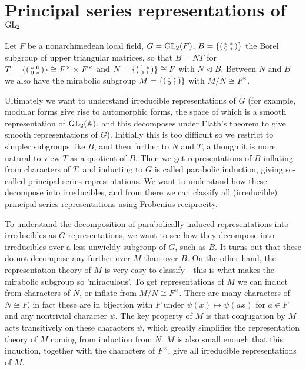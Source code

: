 \section{Principal series representations of $\mathrm{GL}_2$}

Let $F$ be a nonarchimedean local field, $G=\mathrm{GL}_2(F)$, $B=\{\begin{psmallmatrix} *&*\\0&*\end{psmallmatrix}\}$ the Borel subgroup of upper triangular matrices, so that $B=NT$ for $T=\{\begin{psmallmatrix}
    *&0\\0&*
\end{psmallmatrix}\} \cong F^\times \times F^\times$ and $N=\{\begin{psmallmatrix}
    1&*\\0&1
\end{psmallmatrix}\}\cong F$ with $N \lhd B$. Between $N$ and $B$ we also have the mirabolic subgroup $M=\{\begin{psmallmatrix}
    *&*\\0&1
\end{psmallmatrix}\}$ with $M/N \cong F^\times$.

Ultimately we want to understand irreducible representations of $G$ (for example, modular forms give rise to automorphic forms, the space of which is a smooth representation of $\mathrm{GL}_2(\mathbb{A})$, and this decomposes under Flath's theorem to give smooth representations of $G$). Initially this is too difficult so we restrict to simpler subgroups like $B$, and then further to $N$ and $T$, although it is more natural to view $T$ as a quotient of $B$. Then we get representations of $B$ inflating from characters of $T$, and inducting to $G$ is called parabolic induction, giving so-called principal series representations. We want to understand how these decompose into irreducibles, and from there we can classify all (irreducible) principal series representations using Frobenius reciprocity.

To understand the decomposition of parabolically induced representations into irreducibles as $G$-representations, we want to see how they decompose into irreducibles over a less unwieldy subgroup of $G$, such as $B$. It turns out that these do not decompose any further over $M$ than over $B$. On the other hand, the representation theory of $M$ is very easy to classify - this is what makes the mirabolic subgroup so 'miraculous'. To get representations of $M$ we can induct from characters of $N$, or inflate from $M/N\cong F^\times$. There are many characters of $N\cong F$, in fact these are in bijection with $F$ under $\psi(x) \mapsto \psi(ax)$ for $a \in F$ and any nontrivial character $\psi$. The key property of $M$ is that conjugation by $M$ acts transitively on these characters $\psi$, which greatly simplifies the representation theory of $M$ coming from induction from $N$. $M$ is also small enough that this induction, together with the characters of $F^\times$, give all irreducible representations of $M$.

